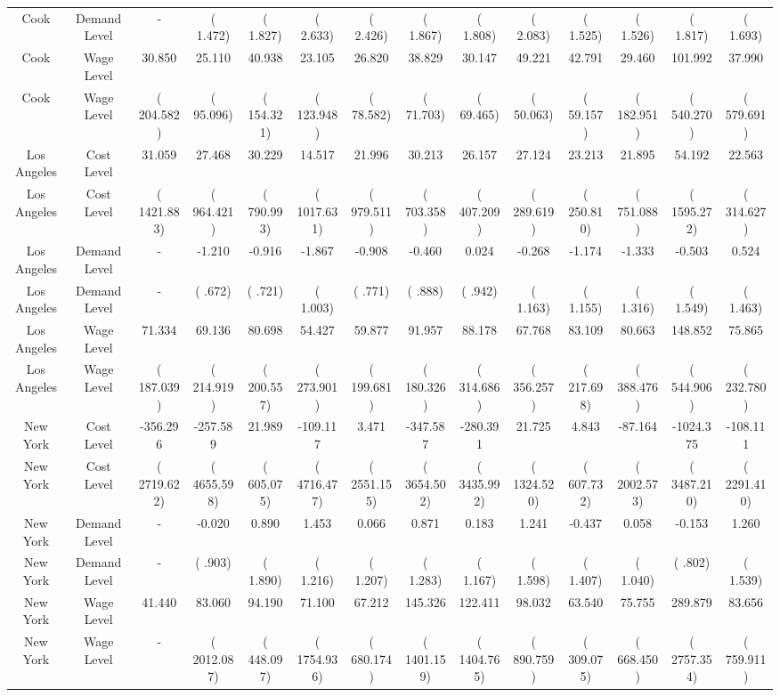 \begin{tabular}[t]{cccccccccccccc}
Cook & Demand Level & - & (    1.472) & (    1.827) & (    2.633) & (    2.426) & (    1.867) & (    1.808) & (    2.083) & (    1.525) & (    1.526) & (    1.817) & (    1.693)\\
Cook & Wage Level & 30.850 & 25.110 & 40.938 & 23.105 & 26.820 & 38.829 & 30.147 & 49.221 & 42.791 & 29.460 & 101.992 & 37.990\\
Cook & Wage Level & (  204.582) & (   95.096) & (  154.321) & (  123.948) & (   78.582) & (   71.703) & (   69.465) & (   50.063) & (   59.157) & (  182.951) & (  540.270) & (  579.691)\\
Los Angeles & Cost Level & 31.059 & 27.468 & 30.229 & 14.517 & 21.996 & 30.213 & 26.157 & 27.124 & 23.213 & 21.895 & 54.192 & 22.563\\
Los Angeles & Cost Level & ( 1421.883) & (  964.421) & (  790.993) & ( 1017.631) & (  979.511) & (  703.358) & (  407.209) & (  289.619) & (  250.810) & (  751.088) & ( 1595.272) & (  314.627)\\
Los Angeles & Demand Level & - & -1.210 & -0.916 & -1.867 & -0.908 & -0.460 & 0.024 & -0.268 & -1.174 & -1.333 & -0.503 & 0.524\\
Los Angeles & Demand Level & - & (   .672) & (   .721) & (    1.003) & (   .771) & (   .888) & (   .942) & (    1.163) & (    1.155) & (    1.316) & (    1.549) & (    1.463)\\
Los Angeles & Wage Level & 71.334 & 69.136 & 80.698 & 54.427 & 59.877 & 91.957 & 88.178 & 67.768 & 83.109 & 80.663 & 148.852 & 75.865\\
Los Angeles & Wage Level & (  187.039) & (  214.919) & (  200.557) & (  273.901) & (  199.681) & (  180.326) & (  314.686) & (  356.257) & (  217.698) & (  388.476) & (  544.906) & (  232.780)\\
New York & Cost Level & -356.296 & -257.589 & 21.989 & -109.117 & 3.471 & -347.587 & -280.391 & 21.725 & 4.843 & -87.164 & -1024.375 & -108.111\\
New York & Cost Level & ( 2719.622) & ( 4655.598) & (  605.075) & ( 4716.477) & ( 2551.155) & ( 3654.502) & ( 3435.992) & ( 1324.520) & (  607.732) & ( 2002.573) & ( 3487.210) & ( 2291.410)\\
New York & Demand Level & - & -0.020 & 0.890 & 1.453 & 0.066 & 0.871 & 0.183 & 1.241 & -0.437 & 0.058 & -0.153 & 1.260\\
New York & Demand Level & - & (   .903) & (    1.890) & (    1.216) & (    1.207) & (    1.283) & (    1.167) & (    1.598) & (    1.407) & (    1.040) & (   .802) & (    1.539)\\
New York & Wage Level & 41.440 & 83.060 & 94.190 & 71.100 & 67.212 & 145.326 & 122.411 & 98.032 & 63.540 & 75.755 & 289.879 & 83.656\\
New York & Wage Level & - & ( 2012.087) & (  448.097) & ( 1754.936) & (  680.174) & ( 1401.159) & ( 1404.765) & (  890.759) & (  309.075) & (  668.450) & ( 2757.354) & (  759.911)\\
\bottomrule
\end{tabular}